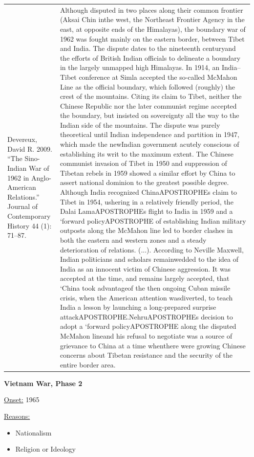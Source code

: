 {\begin{longtable}{p{}p{}}
Devereux, David R. 2009. “The Sino-Indian War of 1962 in Anglo-American Relations.” Journal of Contemporary History 44 (1): 71–87. & Although disputed in two places along their common frontier (Aksai Chin inthe west, the Northeast Frontier Agency in the east, at opposite ends of the Himalayas), the boundary war of 1962 was fought mainly on the eastern border, between Tibet and India. The dispute dates to the nineteenth centuryand the efforts of British Indian officials to delineate a boundary in the largely unmapped high Himalayas. In 1914, an India–Tibet conference at Simla accepted the so-called McMahon Line as the official boundary, which followed (roughly) the crest of the mountains. Citing its claim to Tibet, neither the Chinese Republic nor the later communist regime accepted the boundary, but insisted on sovereignty all the way to the Indian side of the mountains. The dispute was purely theoretical until Indian independence and partition in 1947, which made the newIndian government acutely conscious of establishing its writ to the maximum extent. The Chinese communist invasion of Tibet in 1950 and suppression of Tibetan rebels in 1959 showed a similar effort by China to assert national dominion to the greatest possible degree. Although India recognized ChinaAPOSTROPHEs claim to Tibet in 1954, ushering in a relatively friendly period, the Dalai LamaAPOSTROPHEs flight to India in 1959 and a ‘forward policyAPOSTROPHE of establishing Indian military outposts along the McMahon line led to border clashes in both the eastern and western zones and a steady deterioration of relations. (...).  
According to Neville Maxwell, Indian politicians and scholars remainwedded to the idea of India as an innocent victim of Chinese aggression. It was accepted at the time, and remains largely accepted, that ‘China took advantageof the then ongoing Cuban missile crisis, when the American attention wasdiverted, to teach India a lesson by launching a long-prepared surprise attackAPOSTROPHE.NehruAPOSTROPHEs decision to adopt a ‘forward policyAPOSTROPHE along the disputed McMahon lineand his refusal to negotiate was a source of grievance to China at a time whenthere were growing Chinese concerns about Tibetan resistance and the security of the entire border area.
\\
\end{longtable}}
\clearpage
         \textbf{Vietnam War, Phase 2} 

          \underline{Onset:} 1965         

\underline{Reasons:}
\begin{itemize}
\item Nationalism
\item Religion or Ideology
\end{itemize}

